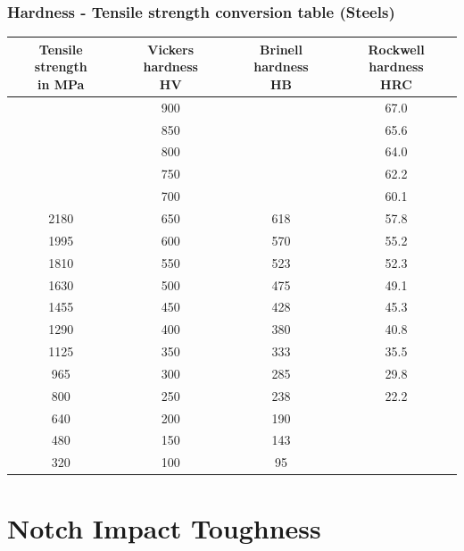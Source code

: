 \documentclass{article}
\begin{document}
\subsubsection{Hardness - Tensile strength conversion table (Steels)}
\begin{table}[h!]
  \centering
  \begin{tabular}{|c|c|c|c|}
    \hline
    \makecell{\textbf{Tensile strength}\\\textbf{in MPa}} &
    \makecell{\textbf{Vickers hardness}\\\textbf{HV}} &
    \makecell{\textbf{Brinell hardness}\\\textbf{HB}} &
    \makecell{\textbf{Rockwell hardness}\\\textbf{HRC}} \\
    \hline
     & 900 & & 67.0 \\
    \hline
     & 850 & & 65.6 \\
    \hline
     & 800 & & 64.0 \\
    \hline
     & 750 & & 62.2 \\
    \hline
     & 700 & & 60.1 \\
    \hline
    2180 & 650 & 618 & 57.8 \\
    \hline
    1995 & 600 & 570 & 55.2 \\
    \hline
    1810 & 550 & 523 & 52.3 \\
    \hline
    1630 & 500 & 475 & 49.1 \\
    \hline
    1455 & 450 & 428 & 45.3 \\
    \hline
    1290 & 400 & 380 & 40.8 \\
    \hline
    1125 & 350 & 333 & 35.5 \\
    \hline
    965 & 300 & 285 & 29.8 \\
    \hline
    800 & 250 & 238 & 22.2 \\
    \hline
    640 & 200 & 190 & \\
    \hline
    480 & 150 & 143 & \\
    \hline
    320 & 100 & 95 & \\
    \hline
  \end{tabular}
\end{table}

\newpage
\section{Notch Impact Toughness}
\end{document}
